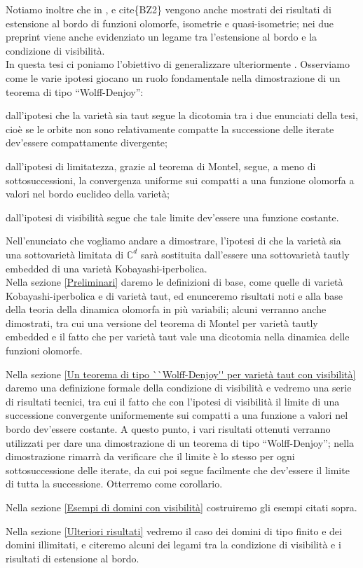 Notiamo inoltre che in \cite{BZ1}, \cite{CMS} e cite\{BZ2\} vengono anche mostrati dei risultati di estensione al bordo di funzioni olomorfe, isometrie e quasi-isometrie; nei due preprint viene anche evidenziato un legame tra l'estensione al bordo e la condizione di visibilità.\\

In questa tesi ci poniamo l'obiettivo di generalizzare ulteriormente \cite[Theorem 1.15]{CMS}. Osserviamo come le varie ipotesi giocano un ruolo fondamentale nella dimostrazione di un teorema di tipo ``Wolff-Denjoy'':
\begin{nlist}
    \item dall'ipotesi che la varietà sia taut segue la dicotomia tra i due enunciati della tesi, cioè se le orbite non sono relativamente compatte la successione delle iterate dev'essere compattamente divergente;
    \item dall'ipotesi di limitatezza, grazie al teorema di Montel, segue, a meno di sottosuccessioni, la convergenza uniforme sui compatti a una funzione olomorfa a valori nel bordo euclideo della varietà;
    \item dall'ipotesi di visibilità segue che tale limite dev'essere una funzione costante.
\end{nlist}

Nell'enunciato che vogliamo andare a dimostrare, l'ipotesi di che la varietà sia una sottovarietà limitata di $\mathbb{C}^d$ sarà sostituita dall'essere una sottovarietà tautly embedded di una varietà Kobayashi-iperbolica. \\

Nella sezione \ref{Preliminari} daremo le definizioni di base, come quelle di varietà Kobayashi-iperbolica e di varietà taut, ed enunceremo risultati noti e alla base della teoria della dinamica olomorfa in più variabili; alcuni verranno anche dimostrati, tra cui una versione del teorema di Montel per varietà tautly embedded e il fatto che per varietà taut vale una dicotomia nella dinamica delle funzioni olomorfe.

Nella sezione \ref{Un teorema di tipo ``Wolff-Denjoy'' per varietà taut con visibilità} daremo una definizione formale della condizione di visibilità e vedremo una serie di risultati tecnici, tra cui il fatto che con l'ipotesi di visibilità il limite di una successione convergente uniformemente sui compatti a una funzione a valori nel bordo dev'essere costante. A questo punto, i vari risultati ottenuti verranno utilizzati per dare una dimostrazione di un teorema di tipo ``Wolff-Denjoy''; nella dimostrazione rimarrà da verificare che il limite è lo stesso per ogni sottosuccessione delle iterate, da cui poi segue facilmente che dev'essere il limite di tutta la successione. Otterremo \cite[Theorem 0.5]{A2} come corollario.

Nella sezione \ref{Esempi di domini con visibilità} costruiremo gli esempi citati sopra.

Nella sezione \ref{Ulteriori risultati} vedremo il caso dei domini di tipo finito e dei domini illimitati, e citeremo alcuni dei legami tra la condizione di visibilità e i risultati di estensione al bordo.